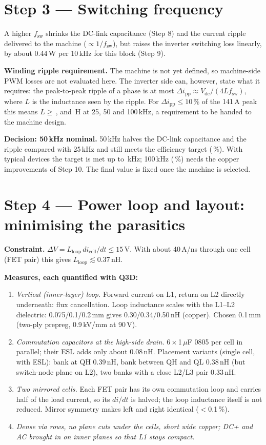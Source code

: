 ﻿\documentclass[10pt,a4paper]{article}
\newcommand{\uF}{\ensuremath{\mu}F}
\begin{document}
\section{Step 3 --- Switching frequency}
A higher $f_\mathrm{sw}$ shrinks the DC-link capacitance (Step 8) and the current ripple delivered to the machine ($\propto1/f_\mathrm{sw}$), but raises the inverter switching loss linearly, by about 0.44\,W per 10\,kHz for this block (Step 9).

\textbf{Winding ripple requirement.} The machine is not yet defined, so machine-side PWM losses are not evaluated here. The inverter side can, however, state what it requires: the peak-to-peak ripple of a phase is at most $\Delta i_\mathrm{pp}\approx V_\mathrm{dc}/(4L f_\mathrm{sw})$, where $L$ is the inductance seen by the ripple. For $\Delta i_\mathrm{pp}\leq10$\,\% of the 141\,A peak this means $L\geq$\,\LreqTwentyFive, \LreqFifty{} and \LreqHundred\,\textmu H at 25, 50 and 100\,kHz, a requirement to be handed to the machine design.

\textbf{Decision: 50\,kHz nominal.} 50\,kHz halves the DC-link capacitance and the ripple compared with 25\,kHz and still meets the efficiency target (\Eta\,\%). With typical devices the target is met up to \Fmax\,kHz; 100\,kHz (\EtaHundred\,\%) needs the copper improvements of Step 10. The final value is fixed once the machine is selected.

\section{Step 4 --- Power loop and layout: minimising the parasitics}
\textbf{Constraint.} $\Delta V=L_\mathrm{loop}\,di_\mathrm{cell}/dt\leq15$\,V. With about 40\,A/ns through one cell (FET pair) this gives $L_\mathrm{loop}\lesssim0.37$\,nH.

\textbf{Measures, each quantified with Q3D:}
\begin{enumerate}\itemsep1pt
\item \emph{Vertical (inner-layer) loop.} Forward current on L1, return on L2 directly underneath: flux cancellation. Loop inductance scales with the L1--L2 dielectric: 0.075/0.1/0.2\,mm gives 0.30/0.34/0.50\,nH (copper). Chosen 0.1\,mm (two-ply prepreg, 0.9\,kV/mm at 90\,V).
\item \emph{Commutation capacitors at the high-side drain.} 6\,$\times$\,1\,\uF{} 0805 per cell in parallel; their ESL adds only about 0.08\,nH. Placement variants (single cell, with ESL): bank at QH 0.39\,nH, bank between QH and QL 0.38\,nH (but switch-node plane on L2), two banks with a close L2/L3 pair 0.33\,nH.
\item \emph{Two mirrored cells.} Each FET pair has its own commutation loop and carries half of the load current, so its $di/dt$ is halved; the loop inductance itself is not reduced. Mirror symmetry makes left and right identical ($<$0.1\,\%).
\item \emph{Dense via rows, no plane cuts under the cells, short wide copper; DC+ and AC brought in on inner planes so that L1 stays compact.}
\end{enumerate}
\end{document}
